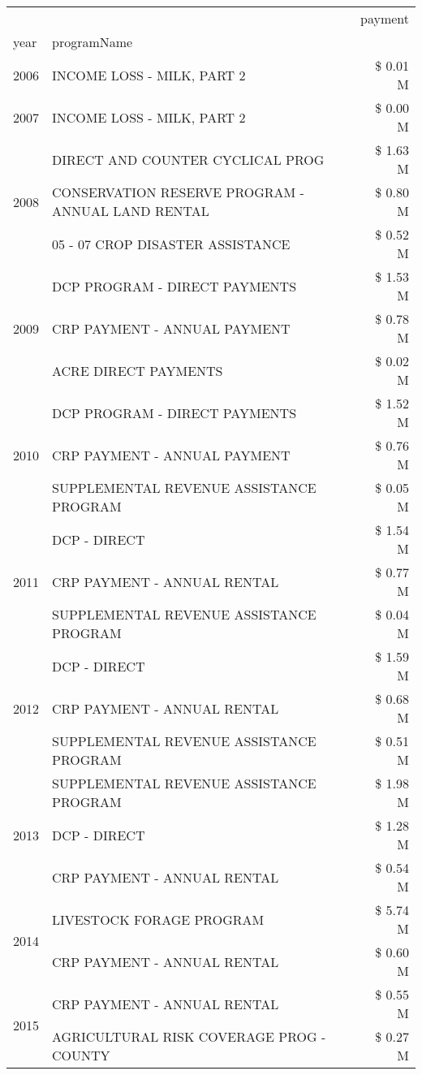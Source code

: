 \begin{tabular}{llr}
\toprule
 &  & payment \\
year & programName &  \\
\midrule
2006 & INCOME LOSS - MILK, PART 2 & \$ 0.01 M \\
\cline{1-3}
2007 & INCOME LOSS - MILK, PART 2 & \$ 0.00 M \\
\cline{1-3}
\multirow[t]{3}{*}{2008} & DIRECT AND COUNTER CYCLICAL PROG & \$ 1.63 M \\
 & CONSERVATION RESERVE PROGRAM - ANNUAL LAND RENTAL & \$ 0.80 M \\
 & 05 - 07 CROP DISASTER ASSISTANCE & \$ 0.52 M \\
\cline{1-3}
\multirow[t]{3}{*}{2009} & DCP PROGRAM - DIRECT PAYMENTS & \$ 1.53 M \\
 & CRP PAYMENT - ANNUAL PAYMENT & \$ 0.78 M \\
 & ACRE DIRECT PAYMENTS & \$ 0.02 M \\
\cline{1-3}
\multirow[t]{3}{*}{2010} & DCP PROGRAM - DIRECT PAYMENTS & \$ 1.52 M \\
 & CRP PAYMENT - ANNUAL PAYMENT & \$ 0.76 M \\
 & SUPPLEMENTAL REVENUE ASSISTANCE PROGRAM & \$ 0.05 M \\
\cline{1-3}
\multirow[t]{3}{*}{2011} & DCP - DIRECT & \$ 1.54 M \\
 & CRP PAYMENT - ANNUAL RENTAL & \$ 0.77 M \\
 & SUPPLEMENTAL REVENUE ASSISTANCE PROGRAM & \$ 0.04 M \\
\cline{1-3}
\multirow[t]{3}{*}{2012} & DCP - DIRECT & \$ 1.59 M \\
 & CRP PAYMENT - ANNUAL RENTAL & \$ 0.68 M \\
 & SUPPLEMENTAL REVENUE ASSISTANCE PROGRAM & \$ 0.51 M \\
\cline{1-3}
\multirow[t]{3}{*}{2013} & SUPPLEMENTAL REVENUE ASSISTANCE PROGRAM & \$ 1.98 M \\
 & DCP - DIRECT & \$ 1.28 M \\
 & CRP PAYMENT - ANNUAL RENTAL & \$ 0.54 M \\
\cline{1-3}
\multirow[t]{2}{*}{2014} & LIVESTOCK FORAGE PROGRAM & \$ 5.74 M \\
 & CRP PAYMENT - ANNUAL RENTAL & \$ 0.60 M \\
\cline{1-3}
\multirow[t]{3}{*}{2015} & CRP PAYMENT - ANNUAL RENTAL & \$ 0.55 M \\
 & AGRICULTURAL RISK COVERAGE PROG - COUNTY & \$ 0.27 M \\

\end{tabular}
